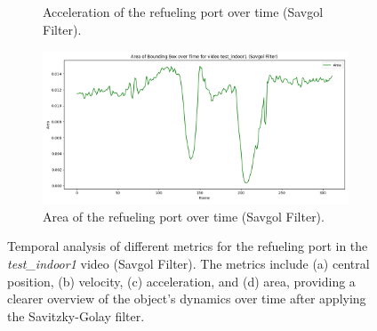 \documentclass[12pt,oneside]{book} %
\begin{document}
\begin{figure}[H]
\begin{subfigure}[t]{0.45\textwidth}
        \caption{Acceleration of the refueling port over time (Savgol Filter).}
        \label{fig:acceleration-test-indoor1-savgol}
    \end{subfigure}
    \hfill
    \begin{subfigure}[t]{0.45\textwidth}
        \includegraphics[width=\textwidth]{figures/bbox_metrics/test_indoor1 (Savgol Filter)_area.png}
        \caption{Area of the refueling port over time (Savgol Filter).}
        \label{fig:size-test-indoor1-savgol}
    \end{subfigure}
    \caption{Temporal analysis of different metrics for the refueling port in the \textit{test\_indoor1} video (Savgol Filter). The metrics include (a) central position, (b) velocity, (c) acceleration, and (d) area, providing a clearer overview of the object's dynamics over time after applying the Savitzky-Golay filter.}
    \label{fig:bbox-metrics-test-indoor1-savgol}
\end{figure}
\end{document}

